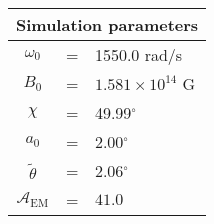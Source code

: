 \begin{tabular}{ccl}
\multicolumn{3}{c}{Simulation parameters} \\
\hline
$\omega_0$  &=& 1550.0 rad/s\\
$B_0$  &=& ${1.581}\times 10^{14}$ G \\
$\chi$  &=& 49.99$^{\circ}$ \\
$a_0$ &=& 2.00$^{\circ}$ \\
$\tilde{\theta}$ &= & 2.06$^{\circ}$ \\
$\mathcal{A}_{\mathrm{EM}}$ &= & $41.0$
\end{tabular}